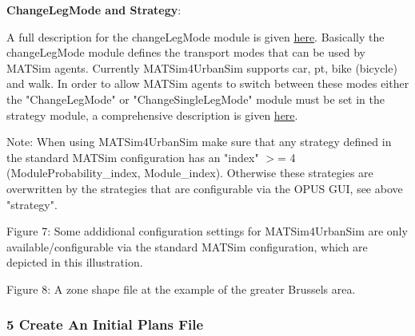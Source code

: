 \documentclass[a4paper,11pt]{report}
\begin{document}

\textbf{ChangeLegMode and Strategy}:

A full description for the changeLegMode module is given \href{http://www.matsim.org/node/387}{here}.  Basically the changeLegMode module defines the transport modes that can  be used by MATSim agents. Currently MATSim4UrbanSim supports car, pt,  bike (bicycle) and walk. In order to allow MATSim agents to switch  between these modes either the "ChangeLegMode" or "ChangeSingleLegMode"  module must be set in the strategy module, a comprehensive description  is given \href{http://www.matsim.org/node/617}{here}.

Note: When using MATSim4UrbanSim  make sure that any strategy defined in the standard MATSim  configuration has an "index" $>$= 4 (ModuleProbability\_index,  Module\_index). Otherwise these strategies are overwritten by the  strategies that are configurable via the OPUS GUI, see above "strategy".



Figure 7: Some addidional configuration settings for MATSim4UrbanSim  are only available/configurable via the standard MATSim configuration,  which are depicted in this illustration.



Figure 8: A zone shape file at the example of the greater Brussels area.

\subsubsection{5 Create An Initial Plans File}
\end{document}
